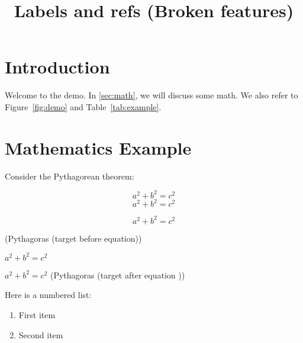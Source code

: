 \documentclass{ximera}
\title{Labels and refs (Broken features)}
\begin{document}
\begin{abstract}
\end{abstract}
\maketitle




\section{Introduction}
\label{sec:intro}

Welcome to the demo. In \autoref{sec:math}, we will discuss some math.
We also refer to Figure~\ref{fig:demo} and Table~\ref{tab:example}.

\section{Mathematics Example}
\label{sec:math}

Consider the Pythagorean theorem:

\begin{equation}
a^2 + b^2 = c^2
\label{abc}
\end{equation}
\begin{equation}
a^2 + b^2 = c^2
\label{eq:pythagorasmath:after}
\end{equation}

\begin{equation}
    \label{eq:pythagorasmath:before}
a^2 + b^2 = c^2
\end{equation}

\begin{center}
\hypertarget{eq:pythagoras:before}{(Pythagoras (target before equation))}
$a^2 + b^2 = c^2$ 
\end{center}

\begin{center}
    $a^2 + b^2 = c^2$ 
    \hypertarget{eq:pythagoras:after}{(Pythagoras (target after equation ))}
\end{center}

Here is a numbered list:
\begin{enumerate}
  \item First item \label{itm:first}
  \item Second item \label{itm:second}
\end{enumerate}
\end{document}
